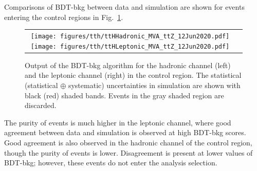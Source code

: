 Comparisons of BDT-bkg between data and simulation are shown for events entering the \ttZ control regions in Fig.~\ref{fig:tth_bdt-bkg_ttz}.

\begin{figure} [htbp!]
    \centering
    \begin{tabular}{c c}
        \texttt{[image: figures/tth/ttHHadronic\_MVA\_ttZ\_12Jun2020.pdf]}
        \texttt{[image: figures/tth/ttHLeptonic\_MVA\_ttZ\_12Jun2020.pdf]}
    \end{tabular}
    \caption{Output of the BDT-bkg algorithm for the hadronic channel (left) and the leptonic channel (right) in the \ttZ control region. The statistical (statistical $\oplus$ systematic) uncertainties in simulation are shown with black (red) shaded bands. Events in the gray shaded region are discarded.} 
    \label{fig:tth_bdt-bkg_ttz}
\end{figure}

The purity of \ttZ events is much higher in the leptonic channel, where good agreement between data and simulation is observed at high BDT-bkg scores.
Good agreement is also observed in the hadronic channel of the \ttZ control region, though the purity of \ttZ events is lower.
Disagreement is present at lower values of BDT-bkg; however, these events do not enter the analysis selection.
